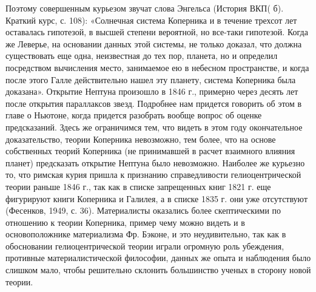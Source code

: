 Поэтому совершенным  курьезом звучат слова Энгельса  (История ВКП( б).
Краткий  курс,  с. 108):  «Солнечная  система  Коперника и  в  течение
трехсот  лет  оставалась гипотезой,  в  высшей  степени вероятной,  но
все-таки  гипотезой.  Когда  же  Леверье,  на  основании  данных  этой
системы,  не  только  доказал,   что  должна  существовать  еще  одна,
неизвестная до тех пор, планета, но и определил посредством вычисления
место,  занимаемое ею  в небесном  пространстве, и  когда после  этого
Галле  действительно   нашел  эту  планету,  система   Коперника  была
доказана». Открытие Нептуна произошло в 1846 г., примерно через десять
лет после открытия параллаксов  звезд. Подробнее нам придется говорить
об этом в  главе о Ньютоне, когда придется разобрать  вообще вопрос об
оценке  предсказаний. Здесь  же  ограничимся тем,  что  видеть в  этом
году  окончательное доказательство,  теории Коперника  невозможно, тем
более, что  на основе собственных  теорий Коперника (не  принимавшей в
расчет  взаимного влияния  планет) предсказать  открытие Нептуна  было
невозможно.  Наиболее  же курьезно  то,  что  римская курия  пришла  к
признанию справедливости гелиоцентрической теории  раньше 1846 г., так
как в списке запрещенных книг 1821 г. еще фигурируют книги Коперника и
Галилея,  а в  списке 1835  г.  они уже  отсутствуют (Фесенков,  1949,
с.  36). Материалисты  оказались  более скептическими  по отношению  к
теории  Коперника,  пример  чему  можно  видеть  и  в  основоположнике
материализма Фр.  Бэконе, и это  неудивительно, так как  в обосновании
гелиоцентрической  теории играли  огромную  роль убеждения,  противные
материалистической  философии,  данных  же  опыта  и  наблюдения  было
слишком мало,  чтобы решительно склонить большинство  ученых в сторону
новой теории.

